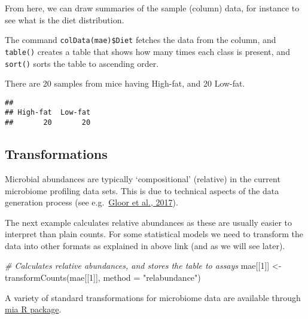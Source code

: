 \documentclass[
  oneside]{book}
\newenvironment{Shaded}{\begin{snugshade}}{\end{snugshade}}
\newcommand{\AttributeTok}[1]{\textcolor[rgb]{0.77,0.63,0.00}{#1}}
\newcommand{\CommentTok}[1]{\textcolor[rgb]{0.56,0.35,0.01}{\textit{#1}}}
\newcommand{\DecValTok}[1]{\textcolor[rgb]{0.00,0.00,0.81}{#1}}
\newcommand{\FunctionTok}[1]{\textcolor[rgb]{0.00,0.00,0.00}{#1}}
\newcommand{\NormalTok}[1]{#1}
\newcommand{\OtherTok}[1]{\textcolor[rgb]{0.56,0.35,0.01}{#1}}
\newcommand{\SpecialCharTok}[1]{\textcolor[rgb]{0.00,0.00,0.00}{#1}}
\newcommand{\StringTok}[1]{\textcolor[rgb]{0.31,0.60,0.02}{#1}}
\begin{document}
From here, we can draw summaries of the sample (column) data, for
instance to see what is the diet distribution.

The command \texttt{colData(mae)\$Diet} fetches the data from the
column, and \texttt{table()} creates a table that shows how many times each
class is present, and \texttt{sort()} sorts the table to ascending order.

There are 20
samples from mice having High-fat,
and 20 Low-fat.

\begin{Shaded}
\end{Shaded}

\begin{verbatim}
## 
## High-fat  Low-fat 
##       20       20
\end{verbatim}

\hypertarget{transformations}{%
\subsection{Transformations}\label{transformations}}

Microbial abundances are typically `compositional' (relative) in the
current microbiome profiling data sets. This is due to technical
aspects of the data generation process (see e.g.~\href{https://www.frontiersin.org/articles/10.3389/fmicb.2017.02224/full}{Gloor et al.,
2017}).

The next example calculates relative abundances as these are usually easier to
interpret than plain counts. For some statistical models we need to
transform the data into other formats as explained in above link (and
as we will see later).

\begin{Shaded}
\begin{Highlighting}[]
\CommentTok{\# Calculates relative abundances, and stores the table to assays}
\NormalTok{mae[[}\DecValTok{1}\NormalTok{]] }\OtherTok{\textless{}{-}} \FunctionTok{transformCounts}\NormalTok{(mae[[}\DecValTok{1}\NormalTok{]], }\AttributeTok{method =} \StringTok{"relabundance"}\NormalTok{)}
\end{Highlighting}
\end{Shaded}

A variety of standard transformations for microbiome data are available through \href{https://microbiome.github.io/mia/reference/transformCounts.html}{mia R package}.
\end{document}

